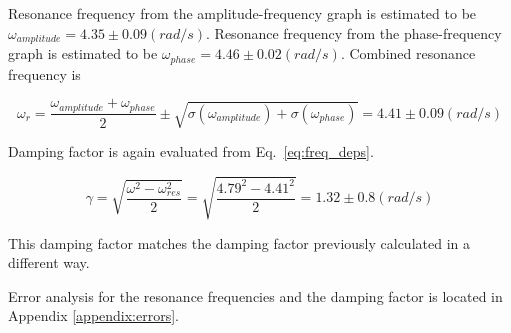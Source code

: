 Resonance frequency from the amplitude-frequency graph is estimated to be $\omega_{amplitude} = 4.35 \pm 0.09 (rad/s)$. Resonance frequency from the phase-frequency graph is estimated to be $\omega_{phase} = 4.46 \pm 0.02 (rad/s)$. Combined resonance frequency is

\begin{equation*}
\omega_{r} = \frac{\omega_{amplitude} + \omega_{phase}}{2} \pm \sqrt{\sigma(\omega_{amplitude}) + \sigma(\omega_{phase})} = 4.41 \pm 0.09 (rad/s)
\end{equation*}

Damping factor is again evaluated from Eq.~\ref{eq:freq_deps}.

\begin{equation*}
        \gamma = \sqrt{ \frac{\omega^2 - \omega_{res}^2}{2} } = \sqrt{ \frac{4.79^2 - 4.41^2}{2} } = 1.32 \pm 0.8 (rad/s)
\end{equation*}       

This damping factor matches the damping factor previously calculated in a different way.

Error analysis for the resonance frequencies and the damping factor is located in Appendix \ref{appendix:errors}.
